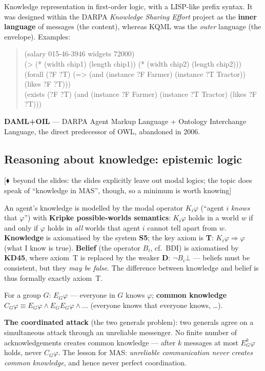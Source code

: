 \documentclass[11pt,a4paper]{article}
\theoremstyle{definition}
\providecommand{\uv}[1]{``#1''}
\newcommand{\mimoq}[1]{\textcolor{markcol}{\textsf{\footnotesize[$\blacklozenge$~beyond the slides: #1]}}}
\begin{document}
\begin{defbox}
Knowledge representation in first-order logic, with a LISP-like prefix syntax. It was designed within
the DARPA \emph{Knowledge Sharing Effort} project as the \textbf{inner language} of messages (the
content), whereas KQML was the \emph{outer} language (the envelope). Examples:
\begin{quote}\small\ttfamily
(salary 015-46-3946 widgets 72000)\\
(> (* (width chip1) (length chip1)) (* (width chip2) (length chip2)))\\
(forall (?F ?T) (=> (and (instance ?F Farmer) (instance ?T Tractor)) (likes ?F ?T)))\\
(exists (?F ?T) (and (instance ?F Farmer) (instance ?T Tractor) (likes ?F ?T)))
\end{quote}
\end{defbox}

\textbf{DAML+OIL} --- DARPA Agent Markup Language + Ontology Interchange Language, the direct
predecessor of OWL, abandoned in 2006.

\subsection{Reasoning about knowledge: epistemic logic}

\noindent\mimoq{the slides explicitly leave out modal logics; the topic does speak of
\uv{knowledge in MAS}, though, so a minimum is worth knowing}

\begin{defbox}
An agent's knowledge is modelled by the modal operator $K_i\varphi$ (\uv{agent $i$ \emph{knows}
that $\varphi$}) with \textbf{Kripke possible-worlds semantics}: $K_i\varphi$ holds in a world
$w$ if and only if $\varphi$ holds in \emph{all} worlds that agent $i$ cannot tell apart from
$w$. \textbf{Knowledge} is axiomatised by the system \textbf{S5}; the key axiom is \textbf{T}:
$K_i\varphi \Rightarrow \varphi$ (what I know is true). \textbf{Belief} (the operator $B_i$,
cf.\ BDI) is axiomatised by \textbf{KD45}, where axiom~T is replaced by the weaker \textbf{D}:
$\neg B_i\bot$ --- beliefs must be consistent, but they \emph{may be false}. The difference
between knowledge and belief is thus formally exactly axiom~T.

For a group $G$: $E_G\varphi$ --- everyone in $G$ knows $\varphi$; \textbf{common knowledge}
$C_G\varphi \equiv E_G\varphi \wedge E_G E_G\varphi \wedge \dots$ (everyone knows that everyone
knows, \dots).

\textbf{The coordinated attack} (the two generals problem): two generals agree on a simultaneous
attack through an unreliable messenger. No finite number of acknowledgements creates common
knowledge --- after $k$ messages at most $E_G^k\varphi$ holds, never $C_G\varphi$. The lesson
for MAS: \emph{unreliable communication never creates common knowledge}, and hence never perfect
coordination.
\end{defbox}
\end{document}
